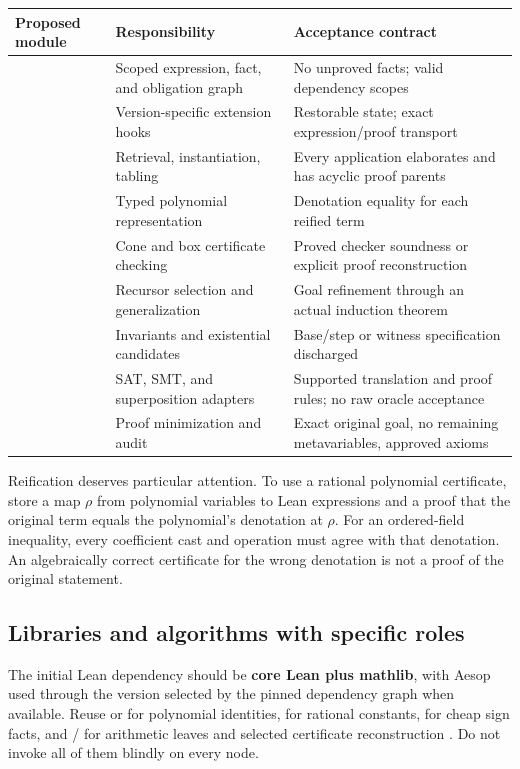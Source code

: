 \begin{center}
\begin{tabularx}{\textwidth}{@{}p{}YY@{}}
\toprule
Proposed module & Responsibility & Acceptance contract\\
\midrule
{} & Scoped expression, fact, and obligation graph & No unproved facts; valid dependency scopes\\
 & Version-specific extension hooks & Restorable state; exact expression/proof transport\\
 & Retrieval, instantiation, tabling & Every application elaborates and has acyclic proof parents\\
 & Typed polynomial representation & Denotation equality for each reified term\\
 & Cone and box certificate checking & Proved checker soundness or explicit proof reconstruction\\
 & Recursor selection and generalization & Goal refinement through an actual induction theorem\\
 & Invariants and existential candidates & Base/step or witness specification discharged\\
 & SAT, SMT, and superposition adapters & Supported translation and proof rules; no raw oracle acceptance\\
 & Proof minimization and audit & Exact original goal, no remaining metavariables, approved axioms\\
\bottomrule
\end{tabularx}
\end{center}

Reification deserves particular attention. To use a rational polynomial
certificate, store a map $\rho$ from polynomial variables to Lean expressions
and a proof that the original term equals the polynomial's denotation at
$\rho$. For an ordered-field inequality, every coefficient cast and operation
must agree with that denotation. An algebraically correct certificate for the
wrong denotation is not a proof of the original statement.

\subsection{Libraries and algorithms with specific roles}

The initial Lean dependency should be \textbf{core Lean plus mathlib}, with
Aesop used through the version selected by the pinned dependency graph when
available. Reuse  or  for polynomial identities,
 for rational constants,  for cheap sign facts,
and / for arithmetic leaves and selected
certificate reconstruction \cite{ring,positivity,linarith}. Do not invoke all
of them blindly on every node.

